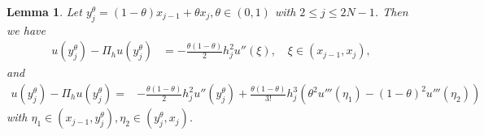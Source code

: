 \documentclass{amsart}
\newtheorem{lemma}[theorem]{Lemma}
\theoremstyle{definition}
\theoremstyle{remark}
\numberwithin{equation}{section}
\begin{document}
\begin{lemma} \label{lmm:Dyj}
  Let \(y_j^\theta = (1-\theta) x_{j-1} + \theta x_j, \theta\in (0,1)\) with $2\le j\le 2N-1$. Then we have
  \begin{equation*}
    \begin{aligned}
      u(y_j^\theta) - \Pi_hu(y_j^\theta) & = -\frac{\theta (1-\theta)}{2} h_j^2 u''(\xi), \quad \xi \in (x_{j-1}, x_j),
    \end{aligned}
  \end{equation*}
  and
  \begin{equation*}
    \begin{aligned}
      u(y_j^\theta) - \Pi_hu(y_j^\theta) = & -\frac{\theta (1-\theta)}{2} h_j^2 u''(y_j^\theta)
      + \frac{\theta (1-\theta)}{3!} h_j^3 \left(\theta^2 u'''(\eta_1) - (1-\theta)^2 u'''(\eta_2) \right)
    \end{aligned}
  \end{equation*}
  with \(\eta_1 \in (x_{j-1}, y_j^\theta), \eta_2 \in (y_j^\theta, x_j)\).
\end{lemma}
\end{document}
